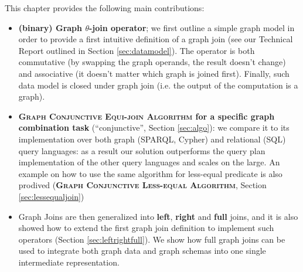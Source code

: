 This chapter provides the following main contributions:

\begin{itemize}
	\item \textbf{(binary) Graph $\theta$-join operator}; we first outline a simple graph model in order to
	provide a first intuitive definition of a graph join (see our Technical Report \cite{BergamiMM16} outlined in
	Section \ref{sec:datamodel}). The operator is both commutative (by swapping the graph operands, the result doesn't change) and associative
	(it doesn't matter which graph is joined first).
	Finally, such data model is closed under graph join (i.e. the output of the computation is a graph).
	\item \textbf{\textsc{Graph Conjunctive Equi-join Algorithm} for a specific graph combination task} (``conjunctive'', Section \ref{sec:algo}): we
	compare it to its implementation
	over both graph  (SPARQL, Cypher) and relational (SQL) query languages: as a result our solution outperforms
	the query plan implementation of the other query languages and scales on the large. An example on how to use the same algorithm for less-equal predicate is also prodived (\textbf{\textsc{Graph Conjunctive Less-equal Algorithm}}, Section \ref{sec:lessequaljoin})
  \item Graph Joins are then generalized into \textbf{left}, \textbf{right} and \textbf{full} joins, and it is also showed how to extend the first graph join definition to implement such operators (Section \ref{sec:leftrightfull}). We show how full graph joins can be used to integrate both graph data and graph schemas into one single intermediate representation.
\end{itemize}